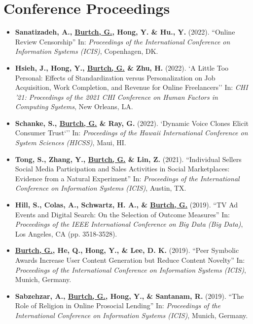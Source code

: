 \documentclass[10.5pt,letterpaper,sans]{moderncv}        %
\begin{document}
\section{Conference Proceedings}

\begin{itemize}

\item \textbf{Sanatizadeh, A., \underline{Burtch, G.}, Hong, Y. \& Hu., Y.} (2022). ``Online Review Censorship'' In: \textit{Proceedings of the International Conference on Information Systems (ICIS)}, Copenhagen, DK.

\item \textbf{Hsieh, J., Hong, Y., \underline{Burtch, G.} \& Zhu, H.} (2022). `A Little Too Personal: Effects of Standardization versus Personalization on Job Acquisition, Work Completion, and Revenue for Online Freelancers'' In: \textit{CHI '21: Proceedings of the 2021 CHI Conference on Human Factors in Computing Systems}, New Orleans, LA.

\item \textbf{Schanke, S., \underline{Burtch, G.} \& Ray, G.} (2022). `Dynamic Voice Clones Elicit Consumer Trust`'' In: \textit{Proceedings of the Hawaii International Conference on System Sciences (HICSS)}, Maui, HI.

\item \textbf{Tong, S., Zhang, Y., \underline{Burtch, G.} \& Lin, Z.} (2021). ``Individual Sellers Social Media Participation and Sales Activities in Social Marketplaces: Evidence from a Natural Experiment'' In: \textit{Proceedings of the International Conference on Information Systems (ICIS)}, Austin, TX.

\item \textbf{Hill, S., Colas, A., Schwartz, H. A., \& \underline{Burtch, G.}} (2019). ``TV Ad Events and Digital Search: On the Selection of Outcome Measures'' In: \textit{Proceedings of the IEEE International Conference on Big Data (Big Data)}, Los Angeles, CA (pp. 3518-3528).

\item \textbf{\underline{Burtch, G.}, He, Q., Hong, Y., \& Lee, D. K.} (2019). ``Peer Symbolic Awards Increase User Content Generation but Reduce Content Novelty'' In: \textit{Proceedings of the International Conference on Information Systems (ICIS)}, Munich, Germany.

\item \textbf{Sabzehzar, A., \underline{Burtch, G.}, Hong, Y., \& Santanam, R.} (2019). ``The Role of Religion in Online Prosocial Lending'' In: \textit{Proceedings of the International Conference on Information Systems (ICIS)}, Munich, Germany.


\end{itemize}
\end{document}

